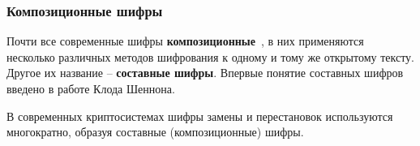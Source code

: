 \subsubsection{Композиционные шифры}

Почти все современные шифры \textbf{композиционные}~\cite{AlZKCh:2001}, в них применяются несколько различных методов шифрования к одному и тому же открытому тексту. Другое их название -- \textbf{составные шифры}. Впервые понятие составных шифров введено в работе Клода Шеннона.

В современных криптосистемах шифры замены и перестановок используются многократно, образуя составные (композиционные) шифры.

